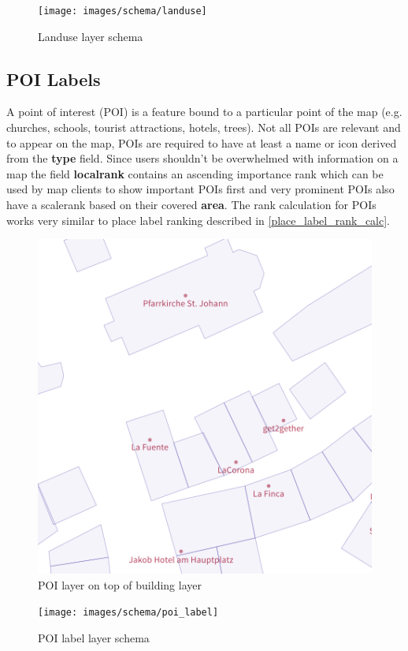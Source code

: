 \begin{figure}[H]
  \centering
  \texttt{[image: images/schema/landuse]}
  \caption{Landuse layer schema}
\end{figure}

\subsection{POI Labels}

\noindent\begin{minipage}[t]{0.48\linewidth}
    \vspace{0pt}
    A point of interest (POI) is a feature bound to a particular point of the map (e.g. churches, schools, tourist attractions, hotels, trees).
    Not all POIs are relevant and to appear on the map, POIs are required to have at least a name or icon derived from the \textbf{type} field.
    Since users shouldn't be overwhelmed with information on a map the field \textbf{localrank} contains an ascending importance rank which can be used by map clients to show important POIs first and very prominent POIs also have a scalerank based on their covered \textbf{area}. The rank calculation for POIs works very similar to place label ranking described in \autoref{place_label_rank_calc}.
\end{minipage}
\hfill
\begin{minipage}[t]{0.48\linewidth}
    \vspace{0pt}
    \begin{figure}[H]
        \includegraphics[width=\textwidth]{images/schema/poi_label_example}
        \caption{POI layer on top of building layer}
    \end{figure}
\end{minipage}
\vspace{20pt}
\begin{figure}[h]
  \centering
  \texttt{[image: images/schema/poi\_label]}
  \caption{POI label layer schema}
\end{figure}

